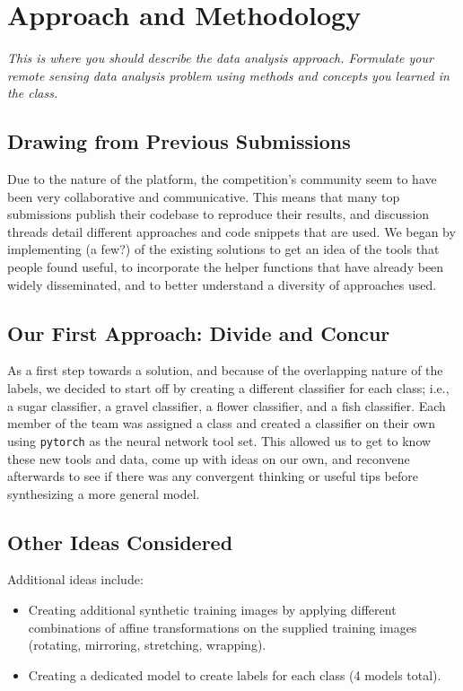 \section{Approach and Methodology}
\textit{This is where you should describe the data analysis approach. Formulate your remote sensing data analysis problem using methods and concepts you learned in the class. }

\subsection{Drawing from Previous Submissions}
Due to the nature of the platform, the competition's community seem to have been very collaborative and communicative. This means that many top submissions publish their codebase to reproduce their results, and discussion threads detail different approaches and code snippets that are used. We began by implementing (a few?) of the existing solutions to get an idea of the tools that people found useful, to incorporate the helper functions that have already been widely disseminated, and to better understand a diversity of approaches used.  

\subsection{Our First Approach: Divide and Concur}
As a first step towards a solution, and because of the overlapping nature of the labels, we decided to start off by creating a different classifier for each class; i.e., a sugar classifier, a gravel classifier, a flower classifier, and a fish classifier. Each member of the team was assigned a class and created a classifier on their own using \texttt{pytorch} as the neural network tool set. This allowed us to get to know these new tools and data, come up with ideas on our own, and reconvene afterwards to see if there was any convergent thinking or useful tips before synthesizing a more general model. 
%

\subsection{Other Ideas Considered}
Additional ideas include: 
\begin{itemize}
    \item Creating additional synthetic training images by applying different combinations of affine transformations on the supplied training images (rotating, mirroring, stretching, wrapping). 
    \item Creating a dedicated model to create labels for each class (4 models total).
\end{itemize}